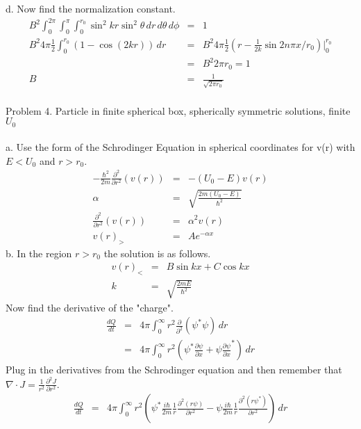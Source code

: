 \documentclass[11pt]{amsart}
\begin{document}
d. Now find the normalization constant. \\
\begin{eqnarray*} 
B^{2}\int_{0}^{2\pi}\int_{0}^{\pi}\int_{0}^{r_{0}}\sin^{2}{kr}\sin^{2}{\theta}\,dr\,d\theta\,d\phi &=& 1 \\
B^{2}4\pi\frac{1}{2}\int_{0}^{r_{0}}(1-\cos(2kr))\,dr &=& B^{2}4\pi\frac{1}{2}(r-\frac{1}{2k}\sin{2n\pi{x}/r_{0}})|_{0}^{r_{0}} \\
&=& B^{2}2\pi{r_{0}} = 1 \\
B &=& \frac{1}{\sqrt{2\pi{r_{0}}}}
\end{eqnarray*} \\

Problem 4.   Particle in finite spherical box, spherically symmetric solutions, finite $U_{0}$ \\ \\
a. Use the form of the Schrodinger Equation in spherical coordinates for v(r) with $E<U_{0}$ and $r>r_{0}$. \\
\begin{eqnarray*}
-\frac{\hbar^{2}}{2m}\frac{\partial^{2}}{\partial{r}^{2}}(v(r)) &=& -(U_{0}-E)v(r) \\
\alpha &=& \sqrt{\frac{2m(U_{0}-E)}{\hbar^{2}}} \\
\frac{\partial^{2}}{\partial{r}^{2}}(v(r)) &=& \alpha^{2}v(r) \\
v(r)_{>} &=& Ae^{-\alpha{x}} 
\end{eqnarray*} 
b. In the region $r>r_{0}$ the solution is as follows. \\
\begin{eqnarray*}
v(r)_{<} &=& B\sin{kx}+C\cos{kx} \\
k &=& \sqrt{\frac{2mE}{\hbar^{2}}} 
\end{eqnarray*} 
Now find the derivative of the "charge". \\
\begin{eqnarray*} 
\frac{dQ}{dt} &=& 4\pi\int_{0}^{\infty}r^{2}\frac{\partial}{\partial^{2}}(\psi^{*}\psi)\,dr \\
&=& 4\pi\int_{0}^{\infty}r^{2}(\psi^{*}\frac{\partial{\psi}}{\partial{x}}+\psi\frac{\partial{\psi}}{\partial{x}}^{*})\,dr 
\end{eqnarray*} 
Plug in the derivatives from the Schrodinger equation and then remember that $\nabla\cdot{J}=\frac{1}{r^{2}}\frac{\partial^{2}J}{\partial{r}^{2}}$. \\
\begin{eqnarray*} 
\frac{dQ}{dt}&=& 4\pi\int_{0}^{\infty}r^{2}(\psi^{*}\frac{i\hbar}{2m}\frac{1}{r}\frac{\partial^{2}(r\psi)}{\partial{r}^{2}}-\psi\frac{i\hbar}{2m}\frac{1}{r}\frac{\partial^{2}(r\psi^{*})}{\partial{r}^{2}})\,dr \\
\end{eqnarray*} \\
\end{document}
